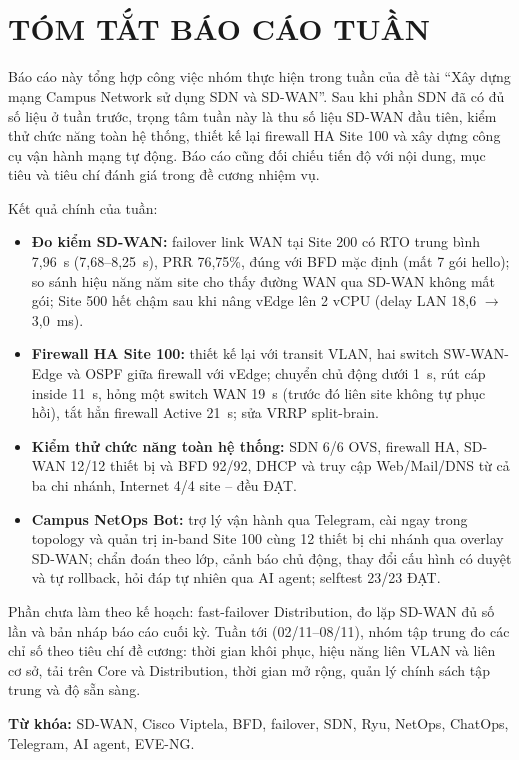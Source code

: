 \section*{\fontsize{18pt}{18pt}\selectfont\MakeUppercase{\de}\\TÓM TẮT BÁO CÁO TUẦN}

Báo cáo này tổng hợp công việc nhóm thực hiện trong tuần \tuanbaocao{} của đề tài ``Xây dựng mạng Campus Network sử dụng SDN và SD-WAN''. Sau khi phần SDN đã có đủ số liệu ở tuần trước, trọng tâm tuần này là thu số liệu SD-WAN đầu tiên, kiểm thử chức năng toàn hệ thống, thiết kế lại firewall HA Site 100 và xây dựng công cụ vận hành mạng tự động. Báo cáo cũng đối chiếu tiến độ với nội dung, mục tiêu và tiêu chí đánh giá trong đề cương nhiệm vụ.

Kết quả chính của tuần:

\begin{itemize}
    \item \textbf{Đo kiểm SD-WAN:} failover link WAN tại Site 200 có RTO trung bình 7,96~s (7,68--8,25~s), PRR 76,75\%, đúng với BFD mặc định (mất 7 gói hello); so sánh hiệu năng năm site cho thấy đường WAN qua SD-WAN không mất gói; Site 500 hết chậm sau khi nâng vEdge lên 2 vCPU (delay LAN 18,6 $\rightarrow$ 3,0~ms).
    \item \textbf{Firewall HA Site 100:} thiết kế lại với transit VLAN, hai switch SW-WAN-Edge và OSPF giữa firewall với vEdge; chuyển chủ động dưới 1~s, rút cáp inside 11~s, hỏng một switch WAN 19~s (trước đó liên site không tự phục hồi), tắt hẳn firewall Active 21~s; sửa VRRP split-brain.
    \item \textbf{Kiểm thử chức năng toàn hệ thống:} SDN 6/6 OVS, firewall HA, SD-WAN 12/12 thiết bị và BFD 92/92, DHCP và truy cập Web/Mail/DNS từ cả ba chi nhánh, Internet 4/4 site -- đều ĐẠT.
    \item \textbf{Campus NetOps Bot:} trợ lý vận hành qua Telegram, cài ngay trong topology và quản trị in-band Site 100 cùng 12 thiết bị chi nhánh qua overlay SD-WAN; chẩn đoán theo lớp, cảnh báo chủ động, thay đổi cấu hình có duyệt và tự rollback, hỏi đáp tự nhiên qua AI agent; selftest 23/23 ĐẠT.
\end{itemize}

Phần chưa làm theo kế hoạch: fast-failover Distribution, đo lặp SD-WAN đủ số lần và bản nháp báo cáo cuối kỳ. Tuần tới (02/11--08/11), nhóm tập trung đo các chỉ số theo tiêu chí đề cương: thời gian khôi phục, hiệu năng liên VLAN và liên cơ sở, tải trên Core và Distribution, thời gian mở rộng, quản lý chính sách tập trung và độ sẵn sàng.

\textbf{Từ khóa:} SD-WAN, Cisco Viptela, BFD, failover, SDN, Ryu, NetOps, ChatOps, Telegram, AI agent, EVE-NG.
